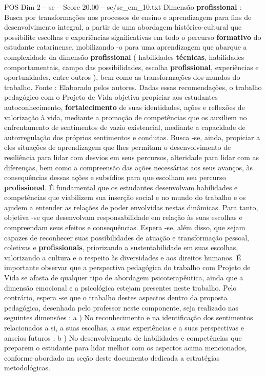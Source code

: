 \begin{textsample}{POS Dim 2 – sc – Score 20.00 – sc/sc\_em\_10.txt}
Dimensão \textbf{profissional} : Busca por transformações nos processos de ensino e aprendizagem para fins de desenvolvimento integral, a partir de uma abordagem histórico-cultural que possibilite escolhas e experiências significativas em todo o percurso \textbf{formativo} do estudante catarinense, mobilizando -o para uma aprendizagem que abarque a complexidade da dimensão \textbf{profissional} ( habilidades \textbf{técnicas}, habilidades comportamentais, campo das possibilidades, escolha \textbf{profissional}, experiências e oportunidades, entre outros ), bem como as transformações dos mundos do trabalho.
Fonte : Elaborado pelos autores.
Dadas essas recomendações, o trabalho pedagógico com o Projeto de Vida objetiva propiciar aos estudantes autoconhecimento, \textbf{fortalecimento} de suas identidades, ações e reflexões de valorização à vida, mediante a promoção de competências que os auxiliem no enfrentamento de sentimentos de vazio existencial, mediante a capacidade de autorregulação dos próprios sentimentos e condutas.
Busca -se, ainda, propiciar a eles situações de aprendizagem que lhes permitam o desenvolvimento de resiliência para lidar com desvios em seus percursos, alteridade para lidar com as diferenças, bem como a compreensão das ações necessárias aos seus avanços, às consequências dessas ações e subsídios para que escolham seu percurso \textbf{profissional}.
É fundamental que os estudantes desenvolvam habilidades e competências que viabilizem sua inserção social e no mundo do trabalho e os ajudem a entender as relações de poder envolvidas nestas dinâmicas.
Para tanto, objetiva -se que desenvolvam responsabilidade em relação às suas escolhas e compreendam seus efeitos e consequências.
Espera -se, além disso, que sejam capazes de reconhecer suas possibilidades de atuação e transformação pessoal, coletivas e \textbf{profissionais}, priorizando a sustentabilidade em suas escolhas, valorizando a cultura e o respeito às diversidades e aos direitos humanos.
É importante observar que a perspectiva pedagógica do trabalho com Projeto de Vida se afasta de qualquer tipo de abordagem psicoterapêutica, ainda que a dimensão emocional e a psicológica estejam presentes neste trabalho.
Pelo contrário, espera -se que o trabalho destes aspectos dentro da proposta pedagógica, desenhada pelo professor neste componente, seja realizado nas seguintes dimensões : a ) No reconhecimento e na identificação dos sentimentos relacionados a si, a suas escolhas, a suas experiências e a suas perspectivas e anseios futuros ; b ) No desenvolvimento de habilidades e competências que preparem o estudante para lidar melhor com os aspectos acima mencionados, conforme abordado na seção deste documento dedicada a estratégias metodológicas.

\end{textsample}
